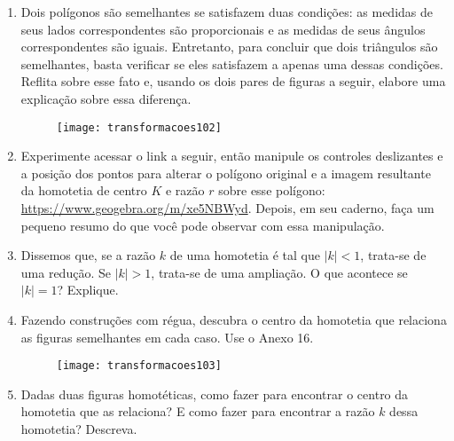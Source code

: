 \exercise

\begin{enumerate}
\item Dois polígonos são semelhantes se satisfazem duas condições: as medidas de seus lados correspondentes são proporcionais e as medidas de seus ângulos correspondentes são iguais. Entretanto, para concluir que dois triângulos são semelhantes, basta verificar se eles satisfazem a apenas uma dessas condições. Reflita sobre esse fato e, usando os dois pares de figuras a seguir, elabore uma explicação sobre essa diferença.

 \begin{figure}[H]
\centering

\texttt{[image: transformacoes102]}
\end{figure}

\item Experimente acessar o link a seguir, então manipule os controles deslizantes e a posição dos pontos para alterar o polígono original e a imagem resultante da homotetia de centro $K$ e razão $r$ sobre esse polígono: \url{https://www.geogebra.org/m/xe5NBWyd}. Depois, em seu caderno, faça um pequeno resumo do que você pode observar com essa manipulação. 

\item Dissemos que, se a razão $k$ de uma homotetia é tal que $|k|<1$, trata-se de uma redução. Se $|k|>1$, trata-se de uma ampliação. O que acontece se $|k|=1$? Explique.

\item Fazendo construções com régua, descubra o centro da homotetia que relaciona as figuras semelhantes em cada caso.  Use o Anexo 16.

\begin{figure}[H]
\centering

\texttt{[image: transformacoes103]}
\end{figure}

\item Dadas duas figuras homotéticas, como fazer para encontrar o centro da homotetia que as relaciona? E como fazer para encontrar a razão $k$ dessa homotetia? Descreva. 


\end{enumerate}
